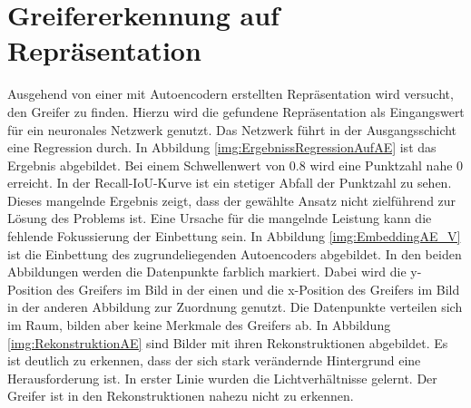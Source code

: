 	\section{Greifererkennung auf Repräsentation}
	\label{sec:GreifererkennungAufAutoencoder}
	Ausgehend von einer mit Autoencodern erstellten Repräsentation wird versucht, den Greifer zu finden. Hierzu wird die gefundene Repräsentation als Eingangswert für ein neuronales Netzwerk genutzt. Das Netzwerk führt in der Ausgangsschicht eine Regression durch. In Abbildung \ref{img:ErgebnissRegressionAufAE} ist das Ergebnis abgebildet. Bei einem Schwellenwert von 0.8 wird eine Punktzahl nahe 0 erreicht. In der Recall-IoU-Kurve ist ein stetiger Abfall der Punktzahl zu sehen. Dieses mangelnde Ergebnis zeigt, dass der gewählte Ansatz nicht zielführend zur Lösung des Problems ist. Eine Ursache für die mangelnde Leistung kann die fehlende Fokussierung der Einbettung sein. In Abbildung \ref{img:EmbeddingAE_V} ist die Einbettung des zugrundeliegenden Autoencoders abgebildet. In den beiden Abbildungen werden die Datenpunkte farblich markiert. Dabei wird die y-Position des Greifers im Bild in der einen und die x-Position des Greifers im Bild in der anderen Abbildung zur Zuordnung genutzt. Die Datenpunkte verteilen sich im Raum, bilden aber keine Merkmale des Greifers ab. In Abbildung \ref{img:RekonstruktionAE} sind Bilder mit ihren Rekonstruktionen abgebildet. Es ist deutlich zu erkennen, dass der sich stark verändernde Hintergrund eine Herausforderung ist. In erster Linie wurden die Lichtverhältnisse gelernt. Der Greifer ist in den Rekonstruktionen nahezu nicht zu erkennen.
